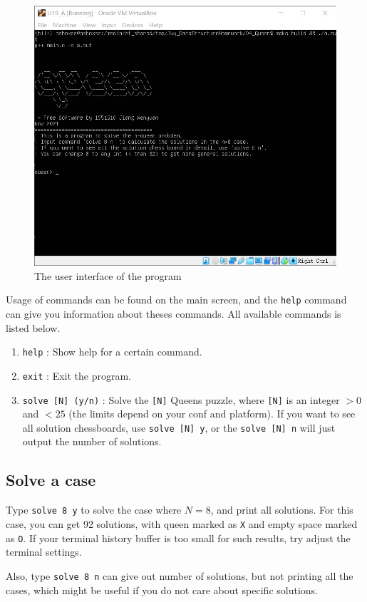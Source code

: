 \documentclass[cn,black,12pt,normal]{elegantnote}
\begin{document}
\begin{figure}[H]
    \centering
    \includegraphics[width=0.7\linewidth]{image/queen_01.jpg}
    \caption{The user interface of the program}
\end{figure}

Usage of commands can be found on the main screen, and the \lstinline{help} command can give you information about theses commands.  All available commands is listed below.

\begin{enumerate}
    \item \lstinline{help} : Show help for a certain command.
    \item \lstinline{exit} : Exit the program.
    \item \lstinline{solve [N] (y/n)} : Solve the \lstinline{[N]} Queens puzzle, where \lstinline{[N]} is an integer $> 0$ and $< 25$ (the limits depend on your conf and platform). If you want to see all solution chessboards, use \lstinline{solve [N] y}, or the \lstinline{solve [N] n} will just output the number of solutions.
\end{enumerate}

\subsection{Solve a case}

Type \lstinline{solve 8 y} to solve the case where $N=8$, and print all solutions. For this case, you can get 92 solutions, with queen marked as \lstinline{X} and empty space marked as \lstinline{O}. If your terminal history buffer is too small for such results, try adjust the terminal settings.

Also, type \lstinline{solve 8 n} can give out number of solutions, but not printing all the cases, which might be useful if you do not care about specific solutions.
\end{document}
